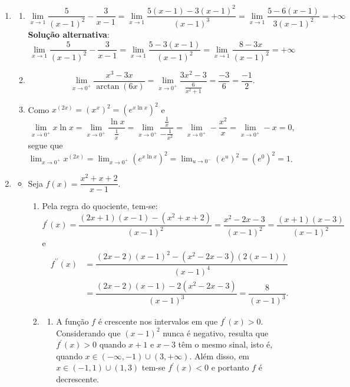 \documentclass[12pt,a4paper]{article}
\begin{document}
\begin{enumerate}
\item
\begin{enumerate}
\item
\[
\lim_{x\to 1} \frac{5}{(x-1)^2}-\frac{3}{x-1}
= \lim_{x\to 1} \frac{5(x-1) -3(x-1)^2}{(x-1)^3}
= \lim_{x\to 1} \frac{5 -6(x-1)}{3(x-1)^2}
= +\infty
\]
\textbf{Solução alternativa}:
\[
\lim_{x\to 1} \frac{5}{(x-1)^2}-\frac{3}{x-1}
= \lim_{x\to 1} \frac{5 -3(x-1)}{(x-1)^2}
= \lim_{x\to 1} \frac{8 - 3x}{(x-1)^2}
= +\infty
\]

\item
\[
  \lim_{x\to 0^+} \frac{x^3-3x}{\arctan(6x)}
= \lim_{x\to 0^+} \frac{3x^2-3}{\frac{6}{x^2+1}}
= \frac{-3}{6}
= \frac{-1}{2}.
\]
\item Como $x^{(2x)} = (x^x)^2 = (e^{x \ln{x}})^2$ e
\[
\lim_{x \to 0^+} x \ln{x}
= \lim_{x \to 0^+} \frac{\ln{x}}{\frac{1}{x}}
= \lim_{x \to 0^+} \frac{\frac{1}{x}}{-\frac{1}{x^2}}
= \lim_{x \to 0^+} -\frac{x^2}{x}
= \lim_{x \to 0^+} -x
= 0,
\]
segue que $\displaystyle\lim_{x\to 0^+} x^{(2x)}
= \lim_{x\to 0^+} (e^{x \ln{x}})^2
= \lim_{u\to 0^-} (e^u)^2
= (e^0)^2 = 1$.
\end{enumerate}

\item
\begin{itemize}
\item Seja $\displaystyle f(x) =\dfrac{x^2 + x + 2}{x-1}$.
\begin{enumerate}
\item Pela regra do quociente, tem-se:
\[
f^\prime(x)
= \dfrac{(2x+1)(x-1) - (x^2 + x + 2)}{(x-1)^2}
= \dfrac{x^2 - 2x - 3}{(x-1)^2}
= \dfrac{(x+1)(x-3)}{(x-1)^2}
\]
e
\begin{align*}
f^{\prime\prime}(x)
& = \dfrac{(2x-2)(x-1)^2 - (x^2 - 2x - 3)(2(x-1))}{(x-1)^4} \\
& = \dfrac{(2x-2)(x-1) - 2(x^2 - 2x - 3)}{(x-1)^3}
  = \dfrac{8}{(x-1)^3}.
\end{align*}

\item
\begin{enumerate}
\item A função $f$ é crescente nos intervalos em que $f^\prime(x) > 0$. Considerando que $(x-1)^2$ nunca é negativo, resulta que $f^\prime(x) > 0$ quando $x+1$ e $x-3$ têm o mesmo sinal, isto é, quando $x \in (-\infty, -1) \cup (3, +\infty)$. Além disso, em $x \in (-1,1) \cup (1, 3)$ tem-se $f^\prime(x) < 0$ e portanto $f$ é decrescente.


\end{enumerate}
\end{enumerate}
\end{itemize}
\end{enumerate}
\end{document}
